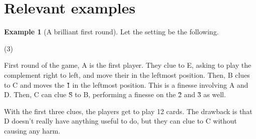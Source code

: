 \documentclass[a4paper]{article}
\theoremstyle{plain}
\theoremstyle{definition}
\newtheorem{example}[theorem]{Example}
\begin{document}
\section{Relevant examples}

\begin{example}[A brilliant first round]
	
	Let the setting be the following.
	
	\begin{tasks}(3)
		\task[+]      
		\task[A]    
		\task[B]    
		\task[C]    
		\task[D]    
		\task[E]    
	\end{tasks}
	
	First round of the game, A is the first player. They clue  to E, asking to play the complement right to left, and move their  in the leftmost position. Then, B clues  to C and moves the \G{1} in the leftmost position. This is a finesse involving A and D. Then, C can clue \G{S} to B, performing a finesse on the \G{2} and \G{3} as well.
	
	With the first three clues, the players get to play 12 cards. The drawback is that D doesn't really have anything useful to do, but they can clue  to C without causing any harm.	
\end{example}
\end{document}
